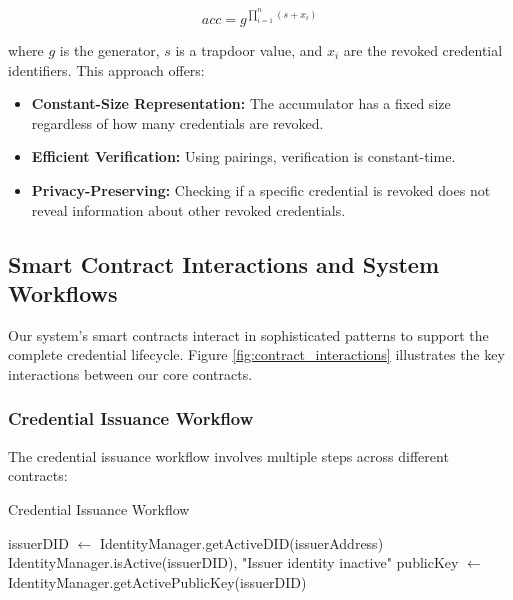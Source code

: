 \documentclass[lettersize,journal]{IEEEtran}
\begin{document}
\begin{itemize}
\begin{equation}
    acc = g^{\prod_{i=1}^{n} (s + x_i)}
\end{equation}

where $g$ is the generator, $s$ is a trapdoor value, and $x_i$ are the revoked credential identifiers. This approach offers:

\begin{itemize}
    \item \textbf{Constant-Size Representation:} The accumulator has a fixed size regardless of how many credentials are revoked.
    \item \textbf{Efficient Verification:} Using pairings, verification is constant-time.
    \item \textbf{Privacy-Preserving:} Checking if a specific credential is revoked does not reveal information about other revoked credentials.
\end{itemize}

\subsection{Smart Contract Interactions and System Workflows}

Our system's smart contracts interact in sophisticated patterns to support the complete credential lifecycle. Figure \ref{fig:contract_interactions} illustrates the key interactions between our core contracts.


\subsubsection{Credential Issuance Workflow}
The credential issuance workflow involves multiple steps across different contracts:

\begin{algorithm}[H]
\caption{Credential Issuance Workflow}
\begin{algorithmic}[1]
\State {}
\State issuerDID $\gets$ IdentityManager.getActiveDID(issuerAddress)
\State \Require IdentityManager.isActive(issuerDID), "Issuer identity inactive"
\State publicKey $\gets$ IdentityManager.getActivePublicKey(issuerDID)


\end{algorithmic}
\end{algorithm}
\end{itemize}
\end{document}
